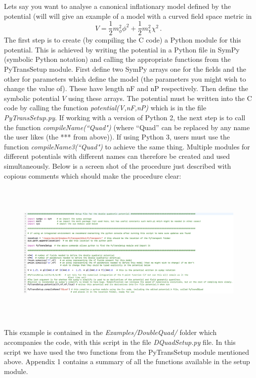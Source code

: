 \documentclass[10pt,
amsmath,amssymb,
aps,prd,nofootinbib,eqsecnum,a4paper]{revtex4}
\def\be{\begin{equation}}
\def\ee{\end{equation}}
\newcommand{\CC}{C\nolinebreak\hspace{-.05em}\raisebox{.4ex}{\tiny\bf +}\nolinebreak\hspace{-.10em}\raisebox{.4ex}{\tiny\bf +}}
\def\CC{{C\nolinebreak[4]\hspace{-.05em}\raisebox{.4ex}{\tiny\bf ++}}}
\def\S{ }
\begin{document}
Lets say you want to analyse a canonical inflationary model defined by the potential (will will give an 
example of a model with a curved field space metric in 
\be
\label{dubquadpot}
V=\frac{1}{2} m^2_{\phi} \phi^2 + \frac{1}{2} m^2_{\chi} \chi^2\,.
\ee
The first step is to create (by compiling the \CC \S  code) a Python module for this potential. This is achieved by writing 
the potential in a Python file in SymPy (symbolic Python notation) and calling the 
appropriate functions from the { PyTransSetup module}. First define two SymPy 
arrays one for the fields and the other for parameters which 
define the model (the parameters you might wish to change the value of). 
These have length nF and nP respectively. 
Then define the symbolic potential $V$ using these arrays. The potential must be written into the 
\CC \S  code by calling the function {\it potential(V,nF,nP)}  which is in the file {\it PyTransSetup.py}.  
If working with a version of Python 2,  the next step is to call the function {\it compileName(``Quad")} (where ``Quad'' can be replaced by any name the user likes (the *** from above)). 
If using Python 3, users must use the function {\it compileName3(``Quad")}
to achieve the same thing. 
Multiple modules for different potentials with different names can therefore be created and 
used simultaneously. Below is a screen shot of the procedure just described with copious comments which should 
make the procedure clear:

\begin{figure}[H]
\centering
\includegraphics[width=18.0cm,height=7cm]{shot1c2}
\end{figure}

\noindent This example is contained in the {\it Examples/DoubleQuad/} folder which accompanies the code, with this script in the file 
{\it DQuadSetup.py} file. In this script 
we have used the two functions from the PyTransSetup module mentioned above. 
Appendix 1 contains a summary of all the functions 
available in the setup module.
\end{document}
